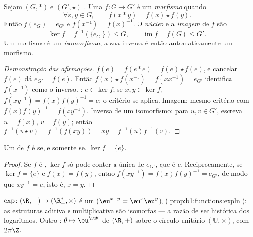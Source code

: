 \begin{definition}\label{def:b1:structures:morphism}
Sejam $(G, *)$ e $(G', \star)$ . Uma  $f \colon G \to G'$
é um \emph{morfismo} quando
\[
\forall x, y \in G, \qquad f(x * y) = f(x) \star f(y).
\]
Então $f(e_G) = e_{G'}$ e $f(x^{-1}) = f(x)^{-1}$. O
\emph{núcleo} e a \emph{imagem} de $f$ são
\[
\ker f = f^{-1}(\{e_{G'}\}) \leq G,
\qquad
\operatorname{im} f = f(G) \leq G' .
\]
Um morfismo  é um \emph{isomorfismo}; a sua  inversa é
então automaticamente um morfismo.
\end{definition}

\begin{proof}[Demonstração das afirmações]
$f(e) = f(e * e) = f(e)\star f(e)$, e cancelar $f(e)$ dá
$e_{G'} = f(e)$. Então $f(x)\star f(x^{-1}) = f(x x^{-1}) = e_{G'}$
identifica $f(x^{-1})$ como o inverso. : $e \in \ker f$; se
$x, y \in \ker f$, $f(xy^{-1}) = f(x)f(y)^{-1} = e$; o critério
se aplica. Imagem: mesmo critério com $f(x)f(y)^{-1} = f(xy^{-1})$.
Inversa de um isomorfismo: para $u, v \in G'$, escreva $u = f(x)$, $v =
f(y)$; então $f^{-1}(u \star v) = f^{-1}(f(xy)) = xy =
f^{-1}(u) f^{-1}(v)$.
\end{proof}

\begin{proposition}\label{prop:b1:structures:kernel}
Um  de  $f$ é  se, e somente se, $\ker f =
\{e\}$.
\end{proposition}

\begin{proof}
Se $f$ é , $\ker f$ só pode conter a única  de
$e_{G'}$, que é $e$. Reciprocamente, se $\ker f = \{e\}$ e $f(x) =
f(y)$, então $f(xy^{-1}) = f(x) f(y)^{-1} = e_{G'}$, de modo que $xy^{-1} = e$,
isto é, $x = y$.
\end{proof}

\begin{example}\label{ex:b1:structures:expmorphism}
$\exp \colon (\R, +) \to (\R_+^*, \times)$ é um 
($\eu^{x+y} = \eu^x \eu^y$), 
(\cref{prop:b1:functions:expln}): as estruturas aditiva e multiplicativa
são isomorfas --- a razão de ser histórica dos
logaritmos. Outro : $\theta \mapsto \eu^{\iu\theta}$ de
$(\R, +)$ sobre o círculo unitário $(\mathbb{U}, \times)$, com 
$2\pi\Z$.
\end{example}

